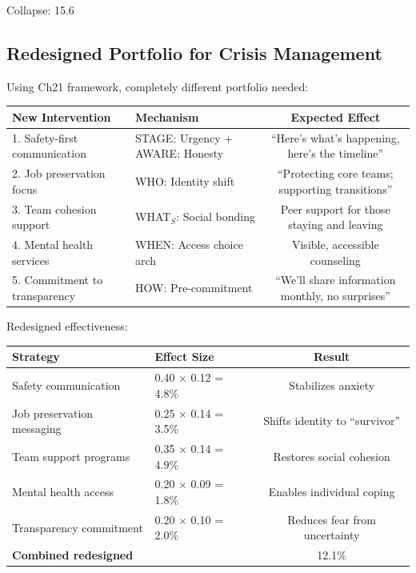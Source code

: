 Collapse: 15.6%

\subsection{Redesigned Portfolio for Crisis Management}

Using Ch21 framework, completely different portfolio needed:

\begin{center}
\begin{tabular}{@{}llc@{}}
\toprule
\textbf{New Intervention} & \textbf{Mechanism} & \textbf{Expected Effect} \\
\midrule
1. Safety-first communication & STAGE: Urgency + AWARE: Honesty & ``Here's what's happening, here's the timeline'' \\
2. Job preservation focus & WHO: Identity shift & ``Protecting core teams; supporting transitions'' \\
3. Team cohesion support & WHAT$_S$: Social bonding & Peer support for those staying and leaving \\
4. Mental health services & WHEN: Access choice arch & Visible, accessible counseling \\
5. Commitment to transparency & HOW: Pre-commitment & ``We'll share information monthly, no surprises'' \\
\midrule
\end{tabular}
\end{center}

Redesigned effectiveness:

\begin{center}
\begin{tabular}{@{}llc@{}}
\toprule
\textbf{Strategy} & \textbf{Effect Size} & \textbf{Result} \\
\midrule
Safety communication & 0.40 × 0.12 = 4.8\% & Stabilizes anxiety \\
Job preservation messaging & 0.25 × 0.14 = 3.5\% & Shifts identity to ``survivor'' \\
Team support programs & 0.35 × 0.14 = 4.9\% & Restores social cohesion \\
Mental health access & 0.20 × 0.09 = 1.8\% & Enables individual coping \\
Transparency commitment & 0.20 × 0.10 = 2.0\% & Reduces fear from uncertainty \\
\midrule
\textbf{Combined redesigned} & & 12.1\% \\
\midrule
\end{tabular}
\end{center}

